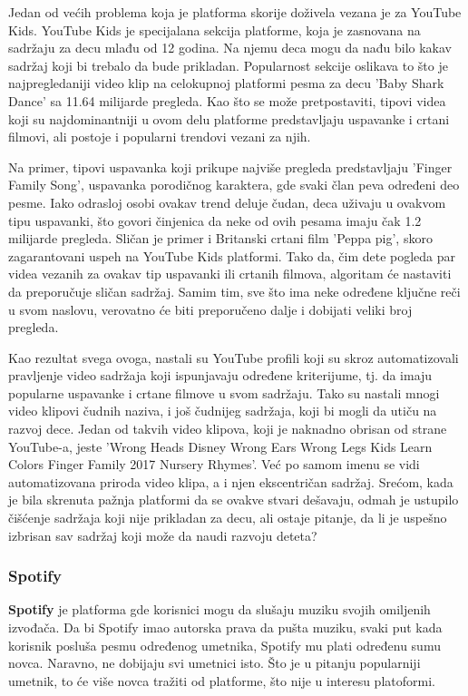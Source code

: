 \documentclass[a4paper]{article}
\begin{document}
Jedan od većih problema koja je platforma skorije doživela vezana je za YouTube Kids. \cite{youtube} YouTube Kids je specijalana sekcija platforme, koja je zasnovana na sadržaju za decu mlađu od 12 godina. Na njemu deca mogu da nađu bilo kakav sadržaj koji bi trebalo da bude prikladan. Popularnost sekcije oslikava to što je najpregledaniji video klip na celokupnoj platformi pesma za decu 'Baby Shark Dance' sa 11.64 milijarde pregleda. Kao što se može pretpostaviti, tipovi videa koji su najdominantniji u ovom delu platforme predstavljaju uspavanke i crtani filmovi, ali postoje i popularni trendovi vezani za njih. 

Na primer, tipovi uspavanka koji prikupe najviše pregleda predstavljaju 'Finger Family Song', uspavanka porodičnog karaktera, gde svaki član peva određeni deo pesme. Iako odrasloj osobi ovakav trend deluje čudan, deca uživaju u ovakvom tipu uspavanki, što govori činjenica da neke od ovih pesama imaju čak 1.2 milijarde pregleda. Sličan je primer i Britanski crtani film 'Peppa pig', skoro zagarantovani uspeh na YouTube Kids platformi. Tako da, čim dete pogleda par videa
vezanih za ovakav tip uspavanki ili crtanih filmova, algoritam će nastaviti da preporučuje sličan sadržaj. Samim tim, sve što ima neke određene ključne reči u svom naslovu, verovatno će biti preporučeno dalje i dobijati veliki broj pregleda.

Kao rezultat svega ovoga, nastali su YouTube profili koji su skroz automatizovali pravljenje video sadržaja koji ispunjavaju određene kriterijume, tj. da imaju popularne uspavanke i crtane filmove u svom sadržaju. Tako su nastali mnogi video klipovi čudnih naziva, i još čudnijeg sadržaja, koji bi mogli da utiču na razvoj dece. Jedan od takvih video klipova, koji je naknadno obrisan od strane YouTube-a, jeste 'Wrong Heads Disney Wrong Ears Wrong Legs Kids Learn Colors Finger Family 2017 Nursery Rhymes'. Već po samom imenu se vidi automatizovana priroda video klipa, a i njen ekscentričan sadržaj.
Srećom, kada je bila skrenuta pažnja platformi da se ovakve stvari dešavaju, odmah je ustupilo čišćenje sadržaja koji nije prikladan za decu, ali ostaje pitanje, da li je uspešno izbrisan sav sadržaj koji može da naudi razvoju deteta? 

\subsubsection{Spotify}
\textbf{Spotify} je platforma gde korisnici mogu da slušaju muziku svojih omiljenih izvođača. Da bi Spotify imao autorska prava da pušta muziku, svaki put kada korisnik posluša pesmu određenog umetnika, Spotify mu plati određenu sumu novca. Naravno, ne dobijaju svi umetnici isto. Što je u pitanju popularniji umetnik, to će više novca tražiti od platforme, što nije u interesu platoformi. 
\end{document}
